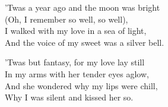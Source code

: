 

\begin{poemblock}
'Twas a year ago and the moon was bright\\
\idt (Oh, I remember so well, so well),\\
I walked with my love in a sea of light,\\
\idt And the voice of my sweet was a silver bell.


'Twas but fantasy, for my love lay still\\
\idt In my arms with her tender eyes aglow,\\
And she wondered why my lips were chill,\\
\idt Why I was silent and kissed her so.

\end{poemblock}
